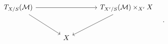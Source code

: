 \[
\begin{tikzcd}[column sep=large,row sep=large]
T_{X/S}(\mathcal M) \arrow[rr] \arrow[dr] && T_{X'/S}(\mathcal M)\times_{X'}X \arrow[dl]\\
& X &
\end{tikzcd}\quad .
\]
